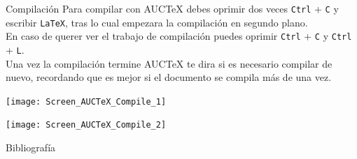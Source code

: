 \documentclass[12pt,aspectratio=43]{beamer}
\begin{document}
\begin{frame}{Compilación}{}
Para compilar con AUC{\TeX} debes oprimir dos veces \texttt{Ctrl} + \texttt{C} y escribir \texttt{LaTeX}, tras lo cual empezara la compilación en segundo plano.\pause\\[1em]

En caso de querer ver el trabajo de compilación puedes oprimir \texttt{Ctrl} + \texttt{C} y \texttt{Ctrl} + \texttt{L}.\pause\\[1em]

Una vez la compilación termine AUC{\TeX} te dira si es necesario compilar de nuevo, recordando que es mejor si el documento se compila más de una vez.
\end{frame}

\begin{frame}[plain]
\begin{center}
	\texttt{[image: Screen\_AUCTeX\_Compile\_1]}
\end{center}
\end{frame}

\begin{frame}[plain]
\begin{center}
	\texttt{[image: Screen\_AUCTeX\_Compile\_2]}
\end{center}
\end{frame}

\begin{frame}{Bibliografía}
\nocite{*}
\printbibliography
\end{frame}
\end{document}
